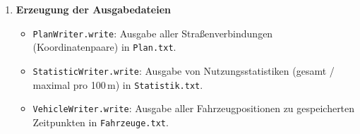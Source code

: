 \begin{enumerate}
  \item \textbf{Erzeugung der Ausgabedateien}
  \begin{itemize}
    \item \texttt{PlanWriter.write}: Ausgabe aller Straßenverbindungen (Koordinatenpaare) in \texttt{Plan.txt}.
    \item \texttt{StatisticWriter.write}: Ausgabe von Nutzungsstatistiken (gesamt / maximal pro 100\,m) in \texttt{Statistik.txt}.
    \item \texttt{VehicleWriter.write}: Ausgabe aller Fahrzeugpositionen zu gespeicherten Zeitpunkten in \texttt{Fahrzeuge.txt}.
  \end{itemize}
\end{enumerate}


